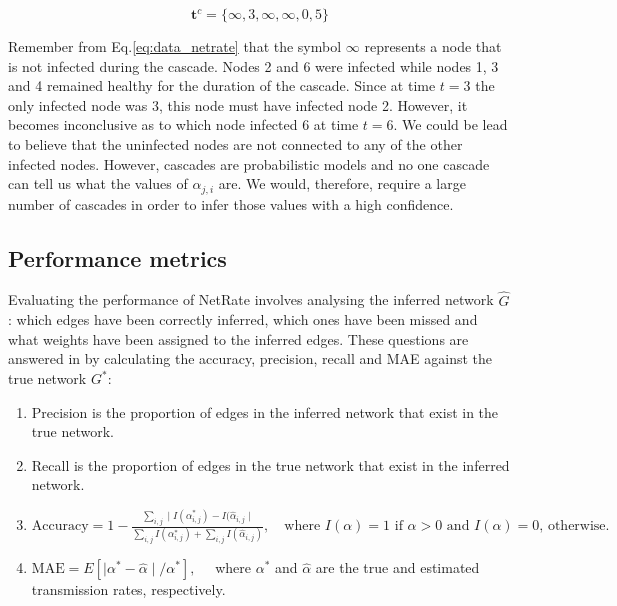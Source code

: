 \begin{equation}\label{eq:cascade_example}
\textbf{t}^{c}=\{\infty, 3, \infty, \infty, 0, 5\}
\end{equation}

Remember from Eq.\ref{eq:data_netrate} that the symbol $\infty $ represents a node that is not infected during the cascade. Nodes 2 and 6 were infected while nodes 1, 3 and 4 remained healthy for the duration of the cascade. Since at time $t=3$ the only infected node was 3, this node must have infected node 2. However, it becomes inconclusive as to which node infected 6 at time $t=6$. We could be lead to believe that the uninfected nodes are not connected to any of the other infected nodes. However, cascades are probabilistic models and no one cascade can tell us what the values of $\alpha_{j,i}$ are. We would, therefore, require a large number of cascades in order to infer those values with a high confidence. 


\subsection{Performance metrics}\label{sec:performance_metrics}

Evaluating the performance of NetRate involves analysing the inferred network $\hat G$: which edges have been correctly inferred, which ones have been missed and what weights have been assigned to the inferred edges. These questions are answered in \cite{rodriguez2011uncovering} by calculating the accuracy, precision, recall and MAE against the true network $G^{*}$:

\begin{enumerate}
\item Precision is the proportion of edges in the inferred network that exist in the true network.
\item Recall is the proportion of edges in the true network that exist in the inferred network.
\item $\text{Accuracy}=1-\frac{\sum_{i,j}\mid I(\alpha_{i,j}^{*})-I(\hat \alpha_{i,j}\mid}{\sum_{i,j}I(\alpha^{*}_{i,j})+\sum_{i,j}I(\hat \alpha _{i,j})}, \quad \text{where } I(\alpha)=1\text{ if } \alpha > 0\text{ and } I(\alpha)=0\text{, otherwise.}$
\item $\text{MAE} = E[\mid \alpha^{*} - \hat \alpha \mid /\alpha^{*}], \quad $ where $ \alpha^{*}$ and $\hat \alpha $ are the true and estimated transmission rates, respectively.
\end{enumerate}

